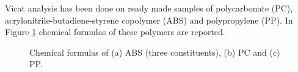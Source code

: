 \documentclass[a4paper, 11pt]{article}
\begin{document}
Vicat analysis has been done on ready made samples of polycarbonate (PC), acrylonitrile-butadiene-styrene copolymer (ABS) and polypropylene (PP). In Figure \ref{fig:chem} chemical formulas of these polymers are reported. 
\begin{figure}[h!]
	\centering
	 \quad 
	 \quad
	\captionsetup{justification=centering}
	\caption{Chemical formulas of (a) ABS (three constituents), (b) PC and (c) PP.}
	\label{fig:chem}
\end{figure}\\
\end{document}
